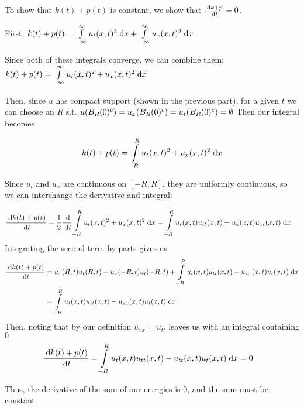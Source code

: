To show that $k(t) + p(t)$ is constant, we show that $\deriv{k + p}{t} = 0$.

First,
$k(t) + p(t) = \int \limits_{-\infty}^{\infty} u_t(x, t)^2 \dx + \int \limits_{-\infty}^{\infty} u_x(x, t)^2 \dx$

Since both of these integrals converge, we can combine them:
$k(t) + p(t) = \int \limits_{-\infty}^{\infty} u_t(x, t)^2 + u_x(x, t)^2 \dx$

Then, since $u$ has compact support (shown in the previous part),
for a given $t$ we can choose an $R$ s.t. $u(\ball{0}{R}^c) = u_x(\ball{0}{R}^c) = u_t(\ball{0}{R}^c) = \emptyset$
Then our integral becomes

$$
k(t) + p(t) = \int \limits_{-R}^{R} u_t(x, t)^2 + u_x(x, t)^2 \dx
$$

Since $u_t$ and $u_x$ are continuous on $[-R, R]$, they are uniformly continuous,
so we can interchange the derivative and integral:

\begin{align*}
\deriv{k(t) + p(t)}{t} &= \frac{1}{2} \deriv{}{t} \int \limits_{-R}^{R} u_t(x, t)^2 + u_x(x, t)^2 \dx
                        = \int \limits_{-R}^{R} u_t(x, t) u_{tt}(x, t) + u_x(x, t) u_{xt}(x, t) \dx
\end{align*}
Integrating the second term by parts gives us
\begin{align*}
  \deriv{k(t) + p(t)}{t} &= u_x(R, t) u_t(R, t) - u_x(-R, t) u_t(-R, t)
                            + \int \limits_{-R}^{R} u_t(x, t) u_{tt}(x, t) - u_{xx}(x, t) u_{t}(x, t) \dx\\
                         &= \int \limits_{-R}^{R} u_t(x, t) u_{tt}(x, t) - u_{xx}(x, t) u_{t}(x, t) \dx
\end{align*}
Then, noting that by our definition $u_{xx} = u_{tt}$ leaves us with an integral containing $0$
\begin{align*}
  \deriv{k(t) + p(t)}{t} &= \int \limits_{-R}^{R} u_t(x, t) u_{tt}(x, t) - u_{tt}(x, t) u_{t}(x, t) \dx = 0
\end{align*}

Thus, the derivative of the sum of our energies is 0, and the sum must be constant.
